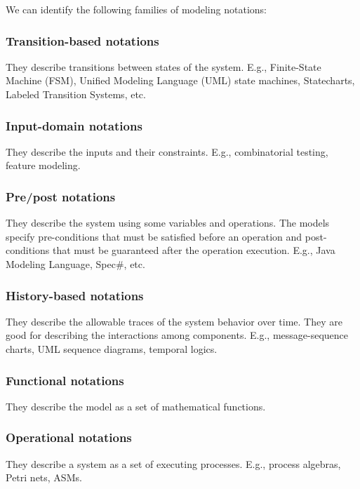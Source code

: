 We can identify the following families of modeling notations:

\subsubsection{Transition-based notations}

They describe transitions between states of the system. E.g., Finite-State Machine (FSM), Unified Modeling Language (UML) state machines, Statecharts, Labeled Transition Systems, etc.

\subsubsection{Input-domain notations}

They describe the inputs and their constraints. E.g., combinatorial testing, feature modeling.

\subsubsection{Pre/post notations}

They describe the system using some variables and operations. The models specify pre-conditions that must be satisfied before an operation and post-conditions that must be guaranteed after the operation execution. E.g., Java Modeling Language, Spec\#, etc.

\subsubsection{History-based notations}

They describe the allowable traces of the system behavior over time. They are good for describing the interactions among components. E.g., message-sequence charts, UML sequence diagrams, temporal logics.

\subsubsection{Functional notations}

They describe the model as a set of mathematical functions.

\subsubsection{Operational notations}

They describe a system as a set of executing processes. E.g., process algebras, Petri nets, ASMs.


